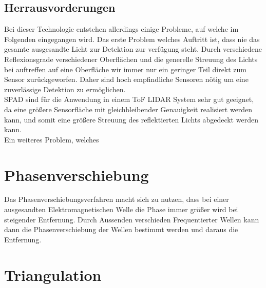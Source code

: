 \subsection{Herrausvorderungen}
Bei dieser Technologie entstehen allerdings einige Probleme, auf welche im Folgenden eingegangen wird. 
Das erste Problem welches Auftritt ist, dass nie das gesamte ausgesandte Licht zur Detektion zur verfügung steht. Durch verschiedene Reflexionsgrade verschiedener Oberflächen und die generelle Streuung des Lichts bei auftreffen auf eine Oberfläche wir immer nur ein geringer Teil direkt zum Sensor zurückgeworfen. Daher sind hoch empfindliche Sensoren nötig um eine zuverlässige Detektion zu ermöglichen.\\
\ac{SPAD} sind für die Anwendung in einem \ac{ToF} \ac{LIDAR} System sehr gut geeignet, da eine größere Sensorfläche mit gleichbleibender Genauigkeit realisiert werden kann, und somit eine größere Streuung des reflektierten Lichts abgedeckt werden kann.\\
Ein weiteres Problem, welches 

\section{Phasenverschiebung}
Das Phasenverschiebungsverfahren macht sich zu nutzen, dass bei einer ausgesandten Elektromagnetischen Welle die Phase immer größer wird bei steigender Entfernung. Durch Aussenden verschieden Frequentierter Wellen kann dann die Phasenverschiebung der Wellen bestimmt werden und daraus die Entfernung.\\
\section{Triangulation}
